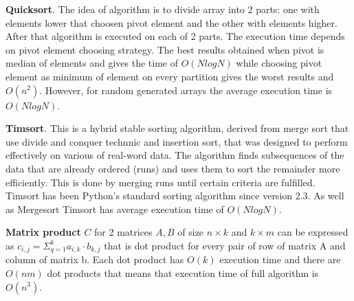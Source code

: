 \textbf{Quicksort}. The idea of algorithm is to divide array into 2 parts: one with elements lower that choosen pivot element and the other with elements higher.
After that algorithm is executed on each of 2 parts. The execution time depends on pivot element choosing strategy. The best results obtained when pivot is median of 
elements and gives the time of $O(NlogN)$ while choosing pivot element as minimum of element on every partition gives the worst results and $O(n^2)$. However, for random generated arrays the
average execution time is $O(NlogN)$.

\textbf{Timsort}. This is a hybrid stable sorting algorithm, derived from merge sort that use divide and conquer technnic and insertion sort, that was designed to perform effectively on various of real-word data.
The algorithm finds subsequences of the data that are already ordered (runs) and uses them to sort the remainder more efficiently. This is done by merging runs until certain criteria are fulfilled. Timsort has been Python's standard sorting algorithm since version 2.3. 
As well as Mergesort Timsort has average execution time of $O(NlogN)$.

\textbf{Matrix product} $C$ for 2 matrices $A, B$ of size $n \times k$ and $k \times m$ can be expressed as $c_{i, j} = \Sigma_{q=1}^{k}a_{i,k} \cdot b_{k, j}$ that is dot product for every pair
of row of matrix A and column of matrix b. Each dot product has $O(k)$ execution time and there are $O(nm)$ dot products that means that execution time of full algorithm is $O(n^3)$.